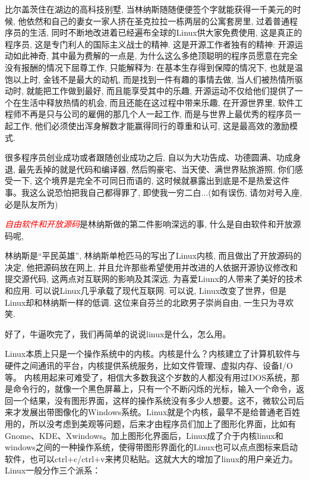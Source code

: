 \documentclass[utf8]{book}
\begin{document}
	比尔盖茨住在湖边的高科技别墅, 当林纳斯随随便便签个字就能获得一千美元的时候, 他依然和自己的妻女一家人挤在圣克拉拉一栋两层的公寓套房里, 过着普通程序员的生活, 同时不断地改进着已经遍布全球的Linux供大家免费使用, 这是真正的程序员, 这是专门利人的国际主义战士的精神. 这是开源工作者独有的精神: 开源运动如此神奇, 其中最为费解的一点是, 为什么这么多绝顶聪明的程序员愿意在完全没有报酬的情况下屈尊工作, 只能解释为: 在基本生存得到保障的情况下, 也就是温饱以上时, 金钱不是最大的动机, 而是找到一件有趣的事情去做, 当人们被热情所驱动时, 就能把工作做到最好, 而且能享受其中的乐趣, 开源运动不仅给他们提供了一个在生活中释放热情的机会, 而且还能在这过程中带来乐趣, 在开源世界里, 软件工程师不再是只与公司的雇佣的那几个人一起工作, 而是与世界上最优秀的程序员一起工作, 他们必须使出浑身解数才能赢得同行的尊重和认可, 这是最高效的激励模式.
	
	很多程序员创业成功或者跟随创业成功之后, 自以为大功告成、功德圆满、功成身退, 最先丢掉的就是代码和编译器, 然后购豪宅、当天使、满世界贴旅游照, 你们感受一下, 这个境界是完全不可同日而语的, 这时候就暴露出到底是不是热爱这件事。我这么说恐怕把我自己都得罪了, 即使我一穷二白...(如有误伤, 请勿对号入座, 必是队友所为)
	

	{\Large \textcolor{red}{\textit{自由软件和开放源码}}}是林纳斯做的第二件影响深远的事, 什么是自由软件和开放源码呢, 
	
	
	林纳斯是“平民英雄”, 林纳斯单枪匹马的写出了Linux内核, 而且做出了开放源码的决定, 他把源码放在网上, 并且允许那些希望使用并改进的人依据开源协议修改和提交源代码, 这两点对互联网的影响及其深远, 为喜爱Liunx的人带来了美好的技术和应用. 可以说Linux几乎承载了现代互联网. 可以说, Linux改变了世界，但是Linux却和林纳斯一样的低调. 这位来自芬兰的北欧男子崇尚自由, 一生只为寻欢笑.
		
	
	好了，牛逼吹完了，我们再简单的说说linux是什么，怎么用。
	
	Linux本质上只是一个操作系统中的内核。内核是什么？内核建立了计算机软件与硬件之间通讯的平台，内核提供系统服务，比如文件管理、虚拟内存、设备I/O等。 内核用起来可难受了，相信大多数我这个岁数的人都没有用过DOS系统，那是命令行的，就像一个黑色屏幕上，只有一个不断闪烁的光标，输入一个命令，返回一个结果，没有图形界面，这样的操作系统没有多少人想要。这不，微软公司后来才发展出带图像化的Windows系统。Linux就是个内核，最早不是给普通老百姓用的，所以没考虑到美观等问题，后来才由程序员们加上了图形化界面，比如有Gnome、KDE、Xwindows。加上图形化界面后，Linux成了介于内核linux和windows之间的一种操作系统，使得带图形界面化的Linux也可以点点图标来启动软件，也可以ctrl+c/ctrl+v来拷贝粘贴。这就大大的增加了linux的用户亲近力。Linux一般分作三个派系：
	
\end{document}
